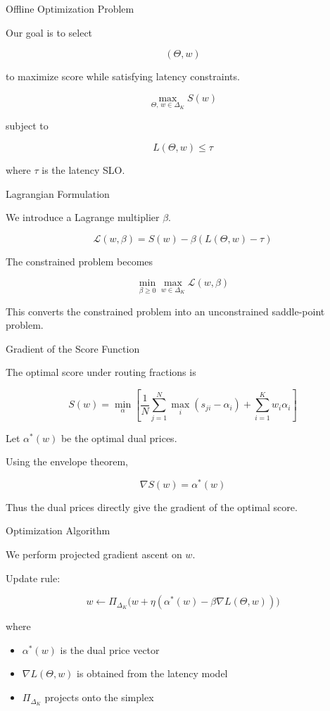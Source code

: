 \documentclass{beamer}
\begin{document}
\begin{frame}{Offline Optimization Problem}

Our goal is to select

\[
(\Theta, w)
\]

to maximize score while satisfying latency constraints.

\[
\max_{\Theta,\, w \in \Delta_K}
S(w)
\]

subject to

\[
L(\Theta, w) \le \tau
\]

where $\tau$ is the latency SLO.

\end{frame}

\begin{frame}{Lagrangian Formulation}

We introduce a Lagrange multiplier $\beta$.

\[
\mathcal{L}(w, \beta)
=
S(w)
-
\beta \left(L(\Theta, w) - \tau\right)
\]

The constrained problem becomes

\[
\min_{\beta \ge 0}
\max_{w \in \Delta_K}
\mathcal{L}(w,\beta)
\]

This converts the constrained problem into an unconstrained saddle-point problem.

\end{frame}

\begin{frame}{Gradient of the Score Function}

The optimal score under routing fractions is

\[
S(w)
=
\min_{\alpha}
\left[
\frac{1}{N}
\sum_{j=1}^N
\max_i (s_{ji} - \alpha_i)
+
\sum_{i=1}^K
w_i \alpha_i
\right]
\]

Let $\alpha^*(w)$ be the optimal dual prices.

Using the envelope theorem,

\[
\nabla S(w) = \alpha^*(w)
\]

Thus the dual prices directly give the gradient of the optimal score.

\end{frame}

\begin{frame}{Optimization Algorithm}

We perform projected gradient ascent on $w$.

Update rule:

\[
w \leftarrow
\Pi_{\Delta_K}
\Big(
w + \eta
(
\alpha^*(w)
-
\beta
\nabla L(\Theta, w)
)
\Big)
\]

where

\begin{itemize}
\item $\alpha^*(w)$ is the dual price vector
\item $\nabla L(\Theta,w)$ is obtained from the latency model
\item $\Pi_{\Delta_K}$ projects onto the simplex
\end{itemize}

\end{frame}
\end{document}
